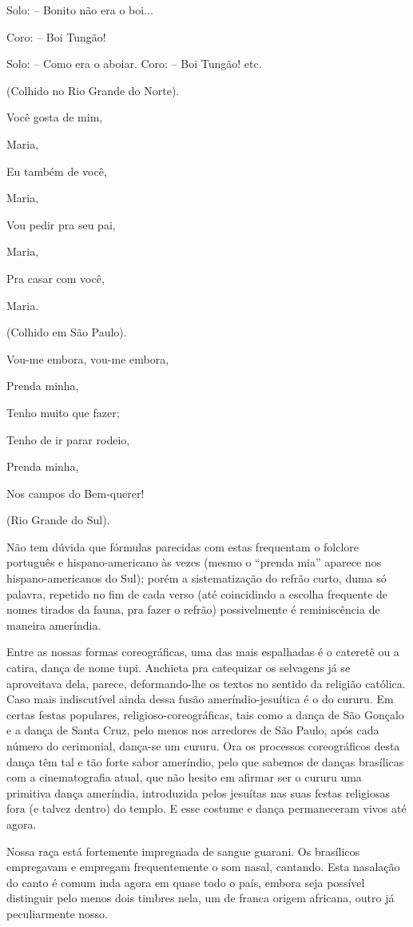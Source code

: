 Solo: -- Bonito não era o boi...

Coro: -- Boi Tungão!

Solo: -- Como era o aboiar. Coro: -- Boi Tungão! etc.

(Colhido no Rio Grande do Norte).

Você gosta de mim,

Maria,

Eu também de você,

Maria,

Vou pedir pra seu pai,

Maria,

Pra casar com você,

Maria.

(Colhido em São Paulo).

Vou-me embora, vou-me embora,

Prenda minha,

Tenho muito que fazer;

Tenho de ir parar rodeio,

Prenda minha,

Nos campos do Bem-querer!

(Rio Grande do Sul).

Não tem dúvida que fórmulas parecidas com estas frequentam o folclore
português e hispano-americano às vezes (mesmo o ``prenda mia'' aparece
nos hispano-americanos do Sul); porém a sistematização do refrão curto,
duma só palavra, repetido no fim de cada verso (até coincidindo a
escolha frequente de nomes tirados da fauna, pra fazer o refrão)
possivelmente é reminiscência de maneira ameríndia.

Entre as nossas formas coreográficas, uma das mais espalhadas é o
cateretê ou a catira, dança de nome tupi. Anchieta pra catequizar os
selvagens já se aproveitava dela, parece, deformando-lhe os textos no
sentido da religião católica. Caso mais indiscutível ainda dessa fusão
ameríndio-jesuítica é o do cururu. Em certas festas populares,
religioso-coreográficas, tais como a dança de São Gonçalo e a dança de
Santa Cruz, pelo menos nos arredores de São Paulo, após cada número do
cerimonial, dança-se um cururu. Ora os processos coreográficos desta
dança têm tal e tão forte sabor ameríndio, pelo que sabemos de danças
brasílicas com a cinematografia atual, que não hesito em afirmar ser o
cururu uma primitiva dança ameríndia, introduzida pelos jesuítas nas
suas festas religiosas fora (e talvez dentro) do templo. E esse costume
e dança permaneceram vivos até agora.

Nossa raça está fortemente impregnada de sangue guarani. Os brasílicos
empregavam e empregam frequentemente o som nasal, cantando. Esta
nasalação do canto é comum inda agora em quase todo o país, embora seja
possível distinguir pelo menos dois timbres nela, um de franca origem
africana, outro já peculiarmente nosso.

